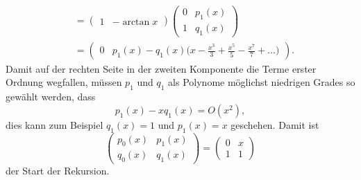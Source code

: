 \begin{refsection}
\begin{align*}
&=
\begin{pmatrix}
1&-\arctan x
\end{pmatrix}
\begin{pmatrix}
0&p_1(x)\\
1&q_1(x)
\end{pmatrix}
\\
&=
\begin{pmatrix}
0
&
p_1(x) - q_1(x)
\biggl(\displaystyle x-\frac{x^3}{3}+\frac{x^5}{5}-\frac{x^7}{7}+\dots\biggr)
\end{pmatrix}.
\end{align*}
Damit auf der rechten Seite in der zweiten Komponente die Terme erster Ordnung
wegfallen, müssen $p_1$ und $q_1$ als Polynome möglichst niedrigen Grades
so gewählt werden, dass
\[
p_1(x)-xq_1(x) = O(x^2),
\]
dies kann zum Beispiel $q_1(x)=1$ und $p_1(x)=x$ geschehen.
Damit ist
\[
\begin{pmatrix}
p_0(x)&p_1(x)\\
q_0(x)&q_1(x)
\end{pmatrix}
=
\begin{pmatrix}
0&x\\
1&1
\end{pmatrix}
\]
der Start der Rekursion.


\end{refsection}
